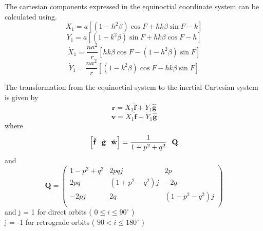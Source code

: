 The cartesian components expressed in the equinoctial coordinate
system can be calculated using.
%
\begin{equation}
   X_1 = a\left[ ( 1 - h^2 \beta) \cos{F} + h k \beta \sin{F} - k   \right]
\end{equation}
%
\begin{equation}
   Y_1 = a\left[ ( 1 - k^2 \beta) \sin{F} + h k \beta \cos{F} - h   \right]
\end{equation}
%
\begin{equation}
  \dot{X}_1 = \frac{n a^2}{r}\left[h k \beta \cos{F} - (1 - h^2 \beta)\sin{F}   \right]
\end{equation}
%
\begin{equation}
  \dot{Y}_1 = \frac{n a^2}{r}\left[  (1 - k^2 \beta)\cos{F}  -  h k \beta \sin{F}   \right]
\end{equation}
%

The transformation from the equinoctial system to the inertial
Cartesian system is given by
%
\begin{equation}
   \mathbf{r} = X_1 \hat{\mathbf{f}} + Y_1 \hat{\mathbf{g}}
\end{equation}
%
\begin{equation}
   \mathbf{v} = \dot{X}_1 \hat{\mathbf{f}} + \dot{Y}_1 \hat{\mathbf{g}}
\end{equation}
%
where
%
\begin{equation}
    \left[ \hat{\mathbf{f}} \hspace{.1 in} \hat{\mathbf{g}} \hspace{.1 in} \hat{\mathbf{w}}
    \right]=  \frac{1}{1+p^2+q^2}\hspace{.1 in} \mathbf{Q}
\end{equation}
%
and
%
\begin{equation} \mathbf{Q} =
 \begin{pmatrix}
               1 - p^2 + q^2 &
               2 p q j &
               2 p \\
%
               2 p q&
               \left( 1 + p^2 - q^2 \right)j &
               -2 q \\
               - 2 p j&
               2 q &
               \left(1 - p^2 - q^2  \right)j \\
     \end{pmatrix}
\end{equation}
%
and
%
\noindent j = 1 for direct orbits ( $0\leq i \leq 90^{\circ}$ )\\
 j = -1 for retrograde orbits ( $90 < i \leq 180^{\circ}$ )\\

